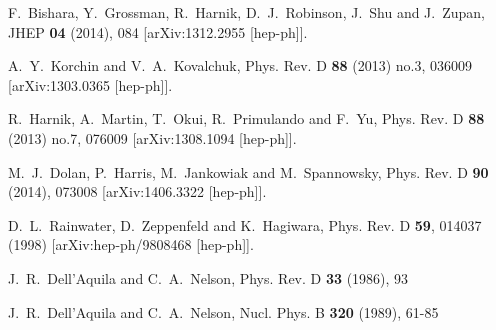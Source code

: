 \documentclass[pdftex,twocolumn,epjc3]{svjour3}          %
\begin{document}
\begin{thebibliography}{9}
F.~Bishara, Y.~Grossman, R.~Harnik, D.~J.~Robinson, J.~Shu and J.~Zupan,
JHEP \textbf{04} (2014), 084
[arXiv:1312.2955 [hep-ph]].

A.~Y.~Korchin and V.~A.~Kovalchuk,
Phys. Rev. D \textbf{88} (2013) no.3, 036009
[arXiv:1303.0365 [hep-ph]].

R.~Harnik, A.~Martin, T.~Okui, R.~Primulando and F.~Yu,
Phys. Rev. D \textbf{88} (2013) no.7, 076009
[arXiv:1308.1094 [hep-ph]].

M.~J.~Dolan, P.~Harris, M.~Jankowiak and M.~Spannowsky,
Phys. Rev. D \textbf{90} (2014), 073008
[arXiv:1406.3322 [hep-ph]].


D.~L.~Rainwater, D.~Zeppenfeld and K.~Hagiwara,
Phys. Rev. D \textbf{59}, 014037 (1998)
[arXiv:hep-ph/9808468 [hep-ph]].

J.~R.~Dell'Aquila and C.~A.~Nelson,
Phys. Rev. D \textbf{33} (1986), 93

J.~R.~Dell'Aquila and C.~A.~Nelson,
Nucl. Phys. B \textbf{320} (1989), 61-85


\end{thebibliography}
\end{document}

